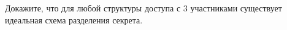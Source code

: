 Докажите, что для любой структуры доступа с $3$ участниками существует идеальная схема разделения
секрета.
